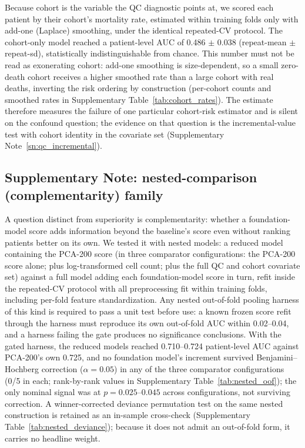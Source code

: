 Because cohort is the variable the QC diagnostic points at, we scored each
patient by their cohort's mortality rate, estimated within training folds
only with add-one (Laplace) smoothing, under the identical repeated-CV
protocol. The cohort-only model reached a patient-level AUC of
0.486 $\pm$ 0.038 (repeat-mean $\pm$ repeat-sd), statistically
indistinguishable from chance. This number must not be read as exonerating
cohort: add-one smoothing is size-dependent, so a small zero-death cohort
receives a higher smoothed rate than a large cohort with real deaths,
inverting the risk ordering by construction (per-cohort counts and smoothed
rates in Supplementary Table~\ref{tab:cohort_rates}). The estimate therefore
measures the failure of one particular cohort-risk estimator and is silent on
the confound question; the evidence on that question is the incremental-value
test with cohort identity in the covariate set
(Supplementary Note~\ref{sn:qc_incremental}).

\subsection{Supplementary Note: nested-comparison (complementarity) family}
\label{sn:nested_comparison}

A question distinct from superiority is complementarity: whether a
foundation-model score adds information beyond the baseline's score even
without ranking patients better on its own. We tested it with nested models:
a reduced model containing the PCA-200 score (in three comparator
configurations: the PCA-200 score alone; plus log-transformed cell count;
plus the full QC and cohort covariate set) against a full model adding each
foundation-model score in turn, refit inside the repeated-CV protocol with
all preprocessing fit within training folds, including per-fold feature
standardization. Any nested out-of-fold pooling harness of this kind is
required to pass a unit test before use: a known frozen score refit through
the harness must reproduce its own out-of-fold AUC within 0.02--0.04, and a
harness failing the gate produces no significance conclusions. With the gated
harness, the reduced models reached 0.710--0.724 patient-level AUC against
PCA-200's own 0.725, and no foundation model's increment survived
Benjamini--Hochberg correction ($\alpha = 0.05$) in any of the three
comparator configurations (0/5 in each; rank-by-rank values in Supplementary
Table~\ref{tab:nested_oof}); the only nominal signal was  at
$p = 0.025$--$0.045$ across configurations, not surviving correction. A
winner-corrected deviance permutation test on the same nested construction is
retained as an in-sample cross-check (Supplementary
Table~\ref{tab:nested_deviance}); because it does not admit an out-of-fold
form, it carries no headline weight.

